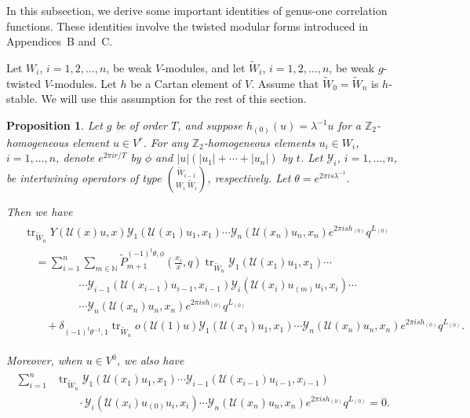\documentclass[9pt]{amsart}
\newtheorem{proposition}{Proposition}[section]
\begin{document}
In this subsection, we derive some important identities of genus-one correlation functions. These identities involve the twisted modular forms introduced in Appendices~B and~C.

Let $W_i$, $i = 1, 2, \ldots, n$, be weak $V$-modules, and let $\tilde{W}_i$, $i = 1, 2, \ldots, n$, be weak $g$-twisted $V$-modules. Let $h$ be a Cartan element of $V$. Assume that $\tilde{W}_0 = \tilde{W}_n$ is $h$-stable. We will use this assumption for the rest of this section.




\begin{proposition}\label{iffq1}
Let $g$ be of order $T$, and suppose $h_{(0)}(u) = \lambda^{-1} u$ for a $\mathbb{Z}_{2}$-homogeneous element $u \in V^{r}$. For any $\mathbb{Z}_{2}$-homogeneous elements $u_i \in W_i$, $i = 1, \ldots, n$, denote $e^{2\pi i r/T}$ by $\phi$ and $|u|(|u_1| + \cdots + |u_n|)$ by $t$. Let $\mathcal{Y}_i$, $i = 1, \ldots, n$, be intertwining operators of type $\binom{\tilde{W}_{i-1}}{W_i\; \tilde{W}_{i}}$, respectively. Let $\theta = e^{2\pi i s \lambda^{-1}}$.

Then we have
\begin{align}\label{iffq2}
\begin{split}
&\operatorname{tr}_{\tilde{W}_n}Y(\mathcal{U}(x)u,x)\mathcal{Y}_1(\mathcal{U}(x_1)u_1,x_1) \cdots \mathcal{Y}_n(\mathcal{U}(x_n)u_n,x_n) e^{2\pi i s h_{(0)}} q^{L_{(0)}} \\
&\quad= \sum_{i=1}^{n} \sum_{m \in \mathbb{N}} \tilde{P}_{m+1}^{(-1)^{t} \theta, \phi}\left( \frac{x_i}{x}, q \right) \operatorname{tr}_{\tilde{W}_n} \mathcal{Y}_1(\mathcal{U}(x_1)u_1,x_1) \cdots \\
&\quad\quad\quad\quad\quad \cdots \mathcal{Y}_{i-1}(\mathcal{U}(x_{i-1})u_{i-1},x_{i-1}) \mathcal{Y}_i(\mathcal{U}(x_i) u_{(m)} u_i, x_i) \cdots \\
&\quad\quad\quad\quad\quad \cdots \mathcal{Y}_n(\mathcal{U}(x_n)u_n,x_n) e^{2\pi i s h_{(0)}} q^{L_{(0)}} \\
&\quad\quad + \delta_{(-1)^t \theta^{-1}, 1} \operatorname{tr}_{\tilde{W}_n} o(\mathcal{U}(1) u) \mathcal{Y}_1(\mathcal{U}(x_1)u_1,x_1) \cdots \mathcal{Y}_n(\mathcal{U}(x_n)u_n,x_n) e^{2\pi i s h_{(0)}} q^{L_{(0)}}.
\end{split}
\end{align}

Moreover, when $u \in V^0$, we also have
\begin{align}\label{iffq8}
\begin{split}
\sum_{i=1}^{n} & \operatorname{tr}_{\tilde{W}_n} \mathcal{Y}_1(\mathcal{U}(x_1)u_1,x_1) \cdots \mathcal{Y}_{i-1}(\mathcal{U}(x_{i-1})u_{i-1},x_{i-1}) \\
&\quad\quad \cdot \mathcal{Y}_i(\mathcal{U}(x_i) u_{(0)} u_i, x_i) \cdots \mathcal{Y}_n(\mathcal{U}(x_n)u_n,x_n) e^{2\pi i s h_{(0)}} q^{L_{(0)}} = 0.
\end{split}
\end{align}
\end{proposition}
\end{document}
